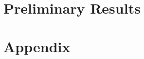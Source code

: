 \documentclass[letterpaper%
, oneside%
, 12pt%
,thesepararticles%
, english%
,creativecommons,hyperref, withAlgo2e%
]{thETS}
\begin{document}
%
%
%
%
%
%	
%	
%		
%		


\chapter{Preliminary Results}

\begin{conclusion}

\end{conclusion}


\appendix

\multiannexe

% 

\chapter{Appendix}



\newpage
\begin{spacing}{1}
    \setlength{\bibsep}{\baselineskip}
	\nocite{*} %


\end{spacing}
\end{document}
